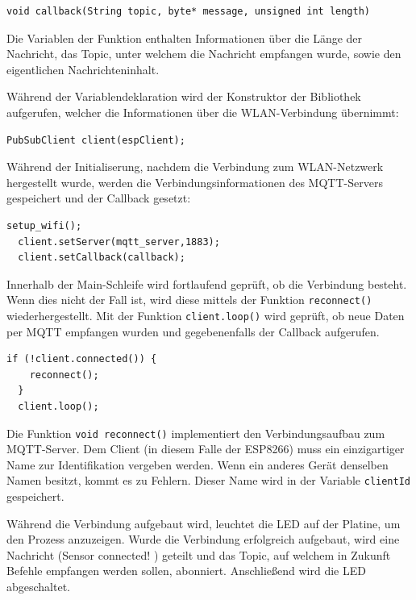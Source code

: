 \begin{lstlisting}[caption={\textit{MQTT Callback}}]
  void callback(String topic, byte* message, unsigned int length)
\end{lstlisting}

Die Variablen der Funktion enthalten Informationen über die Länge der Nachricht, das Topic, unter welchem die Nachricht empfangen wurde, 
sowie den eigentlichen Nachrichteninhalt.

\smallskip

Während der Variablendeklaration wird der Konstruktor der Bibliothek aufgerufen, welcher die Informationen über die \ac{WLAN}-Verbindung
übernimmt:

\begin{lstlisting}[caption={\textit{MQTT Konstruktor}}]
  PubSubClient client(espClient);
\end{lstlisting}

Während der Initialiserung, nachdem die Verbindung zum \ac{WLAN}-Netzwerk hergestellt wurde, werden die Verbindungsinformationen des 
\ac{MQTT}-Servers gespeichert und der Callback gesetzt:


\begin{lstlisting}[caption={\textit{MQTT Initialisierung}}]
  setup_wifi();
  client.setServer(mqtt_server,1883);
  client.setCallback(callback);
\end{lstlisting}

Innerhalb der Main-Schleife wird fortlaufend geprüft, ob die Verbindung besteht. Wenn dies nicht der Fall ist, wird diese mittels der Funktion
\lstinline!reconnect()! wiederhergestellt. Mit der Funktion \lstinline!client.loop()! wird geprüft, ob neue Daten per \ac{MQTT} empfangen wurden
und gegebenenfalls der Callback aufgerufen.
\begin{lstlisting}[caption={\textit{MQTT Verbindungsprüfung, Datenempfang}}]
  if (!client.connected()) {
    reconnect();
  }
  client.loop(); 
\end{lstlisting}

Die Funktion \lstinline!void reconnect()! implementiert den Verbindungsaufbau zum \ac{MQTT}-Server. Dem Client (in diesem Falle der ESP8266)
muss ein einzigartiger Name zur Identifikation vergeben werden. Wenn ein anderes Gerät denselben Namen besitzt, kommt es zu Fehlern. Dieser
Name wird in der Variable \lstinline!clientId! gespeichert. 

\smallskip

Während die Verbindung aufgebaut wird, leuchtet die LED auf der Platine, um den Prozess anzuzeigen. Wurde die Verbindung erfolgreich aufgebaut,
wird eine Nachricht (\glq Sensor connected! \grq) geteilt und das Topic, auf welchem in Zukunft Befehle empfangen werden sollen, abonniert. Anschließend wird die LED
abgeschaltet.

